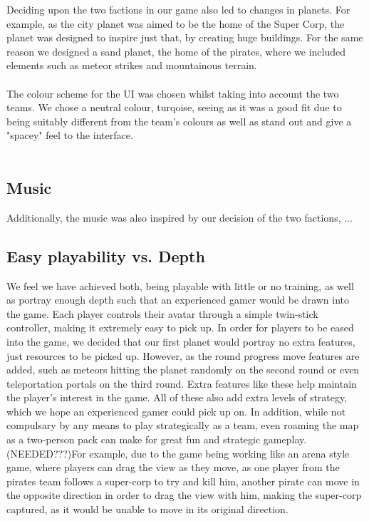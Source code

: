 \documentclass[11pt,a4paper]{article}
\begin{document}
        Deciding upon the two factions in our game also led to changes in planets. For example, as the city planet was aimed to be the home of the Super Corp, the planet was designed to inspire just that, by creating huge buildings. For the same reason we designed a sand planet, the home of the pirates, where we included elements such as meteor strikes and mountainous terrain. \\ \\

        The colour scheme for the UI was chosen whilst taking into account the two teams. We chose a neutral colour, turqoise, seeing as it was a good fit due to being suitably different from the team's colours as well as stand out and give a "spacey" feel to the interface. \\ \\


        \subsection{Music}
        Additionally, the music was also inspired by our decision of the two factions, ...


        \subsection{Easy playability vs. Depth}
        We feel we have achieved both, being playable with little or no training, as well as portray enough depth such that an experienced gamer would be drawn into the game. Each player controls their avatar through a simple twin-stick controller, making it extremely easy to pick up. In order for players to be eased into the game, we decided that our first planet would portray no extra features, just resources to be picked up. However, as the round progress move features are added, such as meteors hitting the planet randomly on the second round or even teleportation portals on the third round. Extra features like these help maintain the player's interest in the game. All of these also add extra levels of strategy, which we hope an experienced gamer could pick up on. In addition, while not compulsary by any means to play strategically as a team, even roaming the map as a two-person pack can make for great fun and strategic gameplay. (NEEDED???)For example, due to the game being working like an arena style game, where players can drag the view as they move, as one player from the pirates team follows a super-corp to try and kill him, another pirate can move in the opposite direction in order to drag the view with him, making the super-corp captured, as it would be unable to move in its original direction. 
\end{document}
